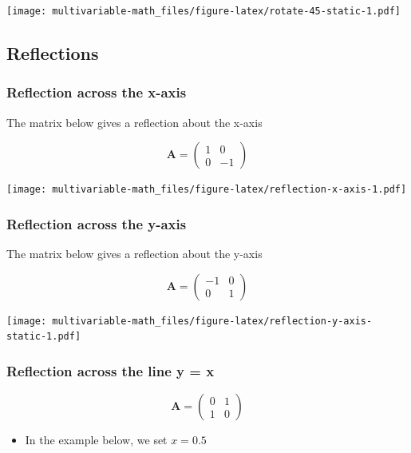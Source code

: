 \documentclass[
]{book}
\providecommand{\tightlist}{%
  \setlength{\itemsep}{0pt}\setlength{\parskip}{0pt}}
\theoremstyle{definition}
\theoremstyle{definition}
\theoremstyle{definition}
\theoremstyle{definition}
\theoremstyle{remark}
\begin{document}
\texttt{[image: multivariable-math\_files/figure-latex/rotate-45-static-1.pdf]}

\hypertarget{reflections}{%
\subsection{Reflections}\label{reflections}}

\hypertarget{reflection-across-the-x-axis}{%
\subsubsection{Reflection across the x-axis}\label{reflection-across-the-x-axis}}

The matrix below gives a reflection about the x-axis

\[
\mathbf{A} = \begin{pmatrix}
1 & 0 \\
0 & -1
\end{pmatrix}
\]

\texttt{[image: multivariable-math\_files/figure-latex/reflection-x-axis-1.pdf]}

\hypertarget{reflection-across-the-y-axis}{%
\subsubsection{Reflection across the y-axis}\label{reflection-across-the-y-axis}}

The matrix below gives a reflection about the y-axis

\[
\mathbf{A} = \begin{pmatrix}
-1 & 0 \\
0 & 1
\end{pmatrix}
\]

\texttt{[image: multivariable-math\_files/figure-latex/reflection-y-axis-static-1.pdf]}

\hypertarget{reflection-across-the-line-y-x}{%
\subsubsection{Reflection across the line y = x}\label{reflection-across-the-line-y-x}}

\[
\mathbf{A} = \begin{pmatrix}
0 & 1 \\
1 & 0
\end{pmatrix}
\]

\begin{itemize}
\tightlist
\item
  In the example below, we set \(x = 0.5\)
\end{itemize}
\end{document}
